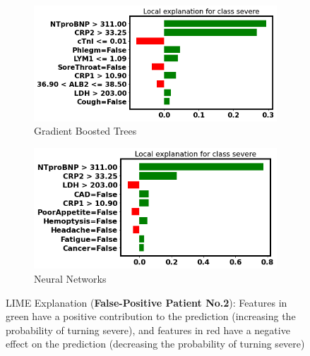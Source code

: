 \begin{figure}[H] \ContinuedFloat
\begin{subfigure}[b]{\textwidth}
    \centering
    \includegraphics[width=\textwidth]{figures/chapter_interp/lime_xgbc_2.png}
    \caption{Gradient Boosted Trees}
    \label{fig:lime_xgb_2}
\end{subfigure}
\hfill
\begin{subfigure}[b]{\textwidth}
    \centering
    \includegraphics[width=\textwidth]{figures/chapter_interp/lime_nn_2.png}
    \caption{Neural Networks}
    \label{fig:lime_nn_2}
\end{subfigure}
\hfill
\caption{LIME Explanation (\textbf{False-Positive Patient No.2}): Features in green have a positive contribution to the prediction (increasing the probability of turning severe), and features in red have a negative effect on the prediction (decreasing the probability of turning severe)}
\label{fig:lime_2}
\end{figure}

\vfill

\clearpage

